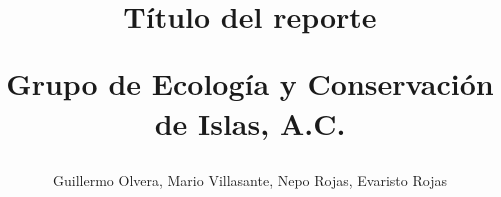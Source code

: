 

\author{Guillermo Olvera, Mario Villasante, Nepo Rojas, Evaristo Rojas}

\title{Título del reporte\\ \begin{large}
    Grupo de Ecología y Conservación de Islas, A.C. \end{large}}



\maketitle


